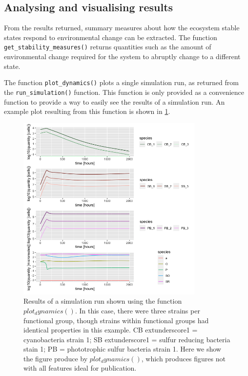\documentclass[]{elsarticle} %
\begin{document}
\hypertarget{analysing-and-visualising-results}{%
\subsection{Analysing and visualising
results}\label{analysing-and-visualising-results}}

From the results returned, summary measures about how the ecosystem
stable states respond to environmental change can be extracted. The
function \texttt{get\_stability\_measures()} returns quantities such as
the amount of environmental change required for the system to abruptly
change to a different state.

The function \texttt{plot\_dynamics()} plots a single simulation run, as
returned from the \texttt{run\_simulation()} function. This function is
only provided as a convenience function to provide a way to easily see
the results of a simulation run. An example plot resulting from this
function is shown in \ref{fig:plot-dynamics}.

\begin{figure}

{\centering \includegraphics[width=350px]{figures/ug_three_strains_dynamics} 

}

\caption{Results of a simulation run shown using the function $plot_dynamics()$. In this case, there were three strains per functional group, though strains within functional groups had identical properties in this example. CB  extunderscore1 = cyanobacteria strain 1; SB extunderscore1 = sulfur reducing bacteria stain 1; PB = phototrophic sulfur bacteria strain 1. Here we show the figure produce by $plot_dynamics()$, which produces figures not with all features ideal for publication.}\label{fig:plot-dynamics}
\end{figure}
\end{document}
